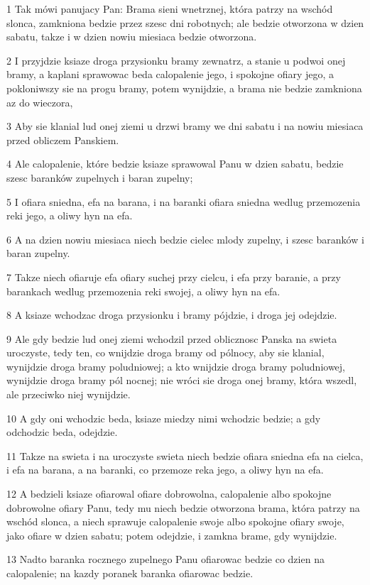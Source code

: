 \par 1 Tak mówi panujacy Pan: Brama sieni wnetrznej, która patrzy na wschód slonca, zamkniona bedzie przez szesc dni robotnych; ale bedzie otworzona w dzien sabatu, takze i w dzien nowiu miesiaca bedzie otworzona.
\par 2 I przyjdzie ksiaze droga przysionku bramy zewnatrz, a stanie u podwoi onej bramy, a kaplani sprawowac beda calopalenie jego, i spokojne ofiary jego, a pokloniwszy sie na progu bramy, potem wynijdzie, a brama nie bedzie zamkniona az do wieczora,
\par 3 Aby sie klanial lud onej ziemi u drzwi bramy we dni sabatu i na nowiu miesiaca przed obliczem Panskiem.
\par 4 Ale calopalenie, które bedzie ksiaze sprawowal Panu w dzien sabatu, bedzie szesc baranków zupelnych i baran zupelny;
\par 5 I ofiara sniedna, efa na barana, i na baranki ofiara sniedna wedlug przemozenia reki jego, a oliwy hyn na efa.
\par 6 A na dzien nowiu miesiaca niech bedzie cielec mlody zupelny, i szesc baranków i baran zupelny.
\par 7 Takze niech ofiaruje efa ofiary suchej przy cielcu, i efa przy baranie, a przy barankach wedlug przemozenia reki swojej, a oliwy hyn na efa.
\par 8 A ksiaze wchodzac droga przysionku i bramy pójdzie, i droga jej odejdzie.
\par 9 Ale gdy bedzie lud onej ziemi wchodzil przed oblicznosc Panska na swieta uroczyste, tedy ten, co wnijdzie droga bramy od pólnocy, aby sie klanial, wynijdzie droga bramy poludniowej; a kto wnijdzie droga bramy poludniowej, wynijdzie droga bramy pól nocnej; nie wróci sie droga onej bramy, która wszedl, ale przeciwko niej wynijdzie.
\par 10 A gdy oni wchodzic beda, ksiaze miedzy nimi wchodzic bedzie; a gdy odchodzic beda, odejdzie.
\par 11 Takze na swieta i na uroczyste swieta niech bedzie ofiara sniedna efa na cielca, i efa na barana, a na baranki, co przemoze reka jego, a oliwy hyn na efa.
\par 12 A bedzieli ksiaze ofiarowal ofiare dobrowolna, calopalenie albo spokojne dobrowolne ofiary Panu, tedy mu niech bedzie otworzona brama, która patrzy na wschód slonca, a niech sprawuje calopalenie swoje albo spokojne ofiary swoje, jako ofiare w dzien sabatu; potem odejdzie, i zamkna brame, gdy wynijdzie.
\par 13 Nadto baranka rocznego zupelnego Panu ofiarowac bedzie co dzien na calopalenie; na kazdy poranek baranka ofiarowac bedzie.
